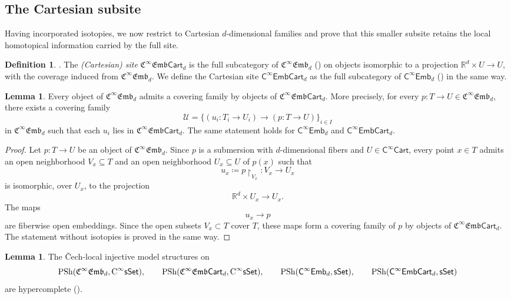 \documentclass{amsart}
\newcommand{\cat}[1]{\mathsf{#1}}
\newcommand{\sset}{\cat{sSet}}
\newcommand{\CsSet}{\textnormal{C}^{\infty}\sset}
\newcommand{\Cart}{\cat{C}^{\infty}\cat{Cart}}
\newcommand{\fembnoniso}[1]{\cat{C}^{\infty}\cat{Emb}_{#1}}
\newcommand{\fembcartnoniso}[1]{\cat{C}^{\infty}\cat{EmbCart}_{#1}}
\newcommand{\femb}[1]{\mathfrak{C}^{\infty}\mathfrak{Emb}_{#1}}
\newcommand{\fembcart}[1]{\mathfrak{C}^{\infty}\mathfrak{Emb}\cat{Cart}_{#1}}
\newcommand{\psh}{\mathrm{PSh}}
\newcommand{\ra}{\rightarrow}
\newcommand{\RR}{{\mathbb{R}}}
\theoremstyle{definition}
\newtheorem{definition}[equation]{Definition}
\newtheorem{lemma}[equation]{Lemma}
\numberwithin{equation}{subsection}
\numberwithin{subsubsection}{subsection}
\begin{document}
\subsection{The Cartesian subsite}

Having incorporated isotopies, we now restrict to Cartesian \(d\)-dimensional
families and prove that this smaller subsite retains the local homotopical
information carried by the full site.

\begin{definition}\label{def:fembcart}
  \textnormal{\cite[Definition~4.10]{GP24}}.
  The \emph{(Cartesian) site} \( \fembcart{d} \) is the full subcategory of
  \( \femb{d} \) () on objects isomorphic to a projection
  \( \RR^{d}\times U \ra U \), with the coverage induced from \( \femb{d}
  \). We define the Cartesian site \( \fembcartnoniso{d} \) as the full
  subcategory of \( \fembnoniso{d} \) () in the same way.
\end{definition}

\begin{lemma}\label{lem:femb.cover.by.fembcart}
  Every object of \( \femb{d} \) admits a
  covering family by objects of
  \( \fembcart{d} \). More precisely, for every \( p:T\to U \in
  \femb{d} \), there exists a covering
  family
  \[
    \mathcal{U}=\{(u_i:T_i\to U_i) \to (p:T\to U)\}_{i\in I}
  \]
  in \( \femb{d} \) such that each \( u_i \) lies in \( \fembcart{d}
  \). The same statement holds for \( \fembnoniso{d} \) and \(
  \fembcartnoniso{d} \).
\end{lemma}

\begin{proof}
  Let \( p:T\to U \) be an object of \( \femb{d} \). Since \( p \) is a
  submersion with \( d \)-dimensional fibers and \( U \in \Cart \),
  every point
  \( x\in T \) admits an open neighborhood \( V_x\subseteq T \) and an open
  neighborhood \( U_x\subseteq U \) of \( p(x) \) such that
  \[
    u_x\coloneqq p\restriction_{V_x}:V_x\longrightarrow U_x
  \]
  is isomorphic, over \( U_x \), to the projection
  \[
    \mathbb{R}^{d}\times U_x\longrightarrow U_x.
  \]
  The maps
  \[
    u_x\longrightarrow p
  \]
  are fiberwise open embeddings. Since the open subsets \(V_x\subset T\) cover
  \(T\), these maps form a covering family of \(p\) by objects of
  \(\fembcart{d}\). The statement without isotopies is proved in the same way.
\end{proof}

\begin{lemma}\label{lem:femb.enough.points.hypercomplete}
  The \v{C}ech-local injective model
  structures on
  \[
    \psh(\femb{d},\CsSet),
    \qquad
    \psh(\fembcart{d},\CsSet),
    \qquad
    \psh(\fembnoniso{d},\sset),
    \qquad
    \psh(\fembcartnoniso{d},\sset)
  \]
  are hypercomplete ().
\end{lemma}
\end{document}
